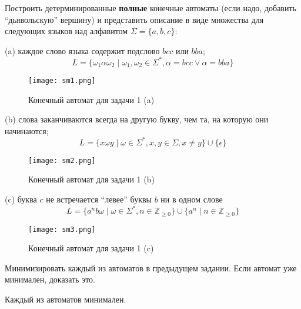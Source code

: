 
\graphicspath{{../1/}{../3/}}


\begin{problem}
Построить детерминированные \textbf{полные} конечные автоматы 
(если надо, добавить “дьявольскую” вершину) и 
представить описание в виде множества для 
следующих языков над алфавитом $\Sigma = \{a, b, c\}$:
\end{problem}

(a) каждое слово языка содержит подслово $bcc$ или $bba$;
$$
    L = \{\omega_1\alpha\omega_2 \mid \omega_1, \omega_2 \in \Sigma^*, \alpha=bcc \lor \alpha = bba \}
$$
\begin{figure}[h]
    \texttt{[image: sm1.png]}
    \caption{Конечный автомат для задачи 1 (a)}
\end{figure}

(b) слова заканчиваются всегда на другую букву, чем та, на которую они начинаются;
$$
    L = \{x \omega y \mid \omega \in \Sigma^*, x, y \in \Sigma, x \ne y \} \cup \{\epsilon\}
$$
\begin{figure}[h]
    \texttt{[image: sm2.png]}
    \caption{Конечный автомат для задачи 1 (b)}
\end{figure}

(c) буква $c$ не встречается “левее” буквы $b$ ни в одном слове
$$
    L = \{a^n b \omega \mid \omega \in \Sigma^*, n \in \mathbb{Z}_{\ge 0} \} \cup
    \{ a^n \mid n \in \mathbb{Z}_{\ge 0} \}
$$
\begin{figure}[h]
    \texttt{[image: sm3.png]}
    \caption{Конечный автомат для задачи 1 (c)}
\end{figure}

\begin{problem}
    Минимизировать каждый из автоматов в предыдущем задании. Если автомат уже
    минимален, доказать это.
\end{problem}

Каждый из автоматов минимален. 

